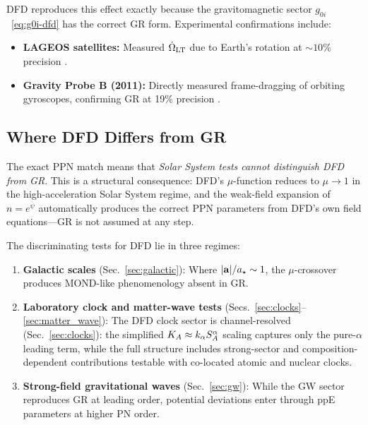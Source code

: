 DFD reproduces this effect exactly because the gravitomagnetic sector $g_{0i}$~\eqref{eq:g0i-dfd} has the correct GR form. Experimental confirmations include:
\begin{itemize}
\item \textbf{LAGEOS satellites:} Measured $\dot{\Omega}_{\rm LT}$ due to Earth's rotation at $\sim 10\%$ precision \cite{Ciufolini2004}.
\item \textbf{Gravity Probe B (2011):} Directly measured frame-dragging of orbiting gyroscopes, confirming GR at 19\% precision \cite{Everitt2011}.
\end{itemize}

\subsection{Where DFD Differs from GR}\label{sec:ppn-where-different}

The exact PPN match means that \textit{Solar System tests cannot distinguish DFD from GR}. This is a structural consequence: DFD's $\mu$-function reduces to $\mu \to 1$ in the high-acceleration Solar System regime, and the weak-field expansion of $n = e^\psi$ automatically produces the correct PPN parameters from DFD's own field equations---GR is not assumed at any step.

The discriminating tests for DFD lie in three regimes:

\begin{enumerate}
\item \textbf{Galactic scales} (Sec.~\ref{sec:galactic}): Where $|\mathbf{a}|/a_\star \sim 1$, the $\mu$-crossover produces MOND-like phenomenology absent in GR.

\item \textbf{Laboratory clock and matter-wave tests} (Secs.~\ref{sec:clocks}--\ref{sec:matter_wave}): The DFD clock sector is channel-resolved (Sec.~\ref{sec:clocks}): the simplified $K_A \approx k_\alpha S_A^{\alpha}$ scaling captures only the pure-$\alpha$ leading term, while the full structure includes strong-sector and composition-dependent contributions testable with co-located atomic and nuclear clocks.

\item \textbf{Strong-field gravitational waves} (Sec.~\ref{sec:gw}): While the GW sector reproduces GR at leading order, potential deviations enter through ppE parameters at higher PN order.
\end{enumerate}

